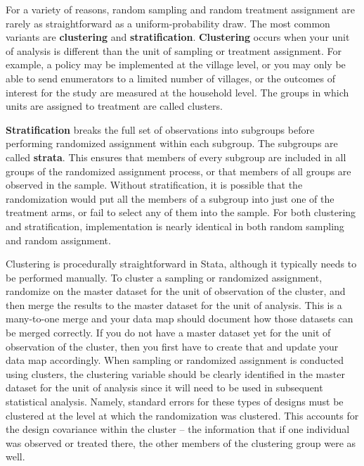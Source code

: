 For a variety of reasons, random sampling and random treatment assignment
are rarely as straightforward as a uniform-probability draw.
The most common variants are \textbf{clustering} and \textbf{stratification}.\cite{athey2017econometrics}
\textbf{Clustering} occurs when your unit of analysis is different
than the unit of sampling or treatment assignment.
For example, a policy may be implemented at the village level,
or you may only be able to send enumerators to a limited number of villages,
or the outcomes of interest for the study are measured at the household level.
The groups in which units are assigned to treatment are called clusters.
  
\textbf{Stratification} breaks the full set of observations into subgroups
before performing randomized assignment within each subgroup.
The subgroups are called \textbf{strata}.
This ensures that members of every subgroup
are included in all groups of the randomized assignment process,
or that members of all groups are observed in the sample.
Without stratification, it is possible that the randomization
would put all the members of a subgroup into just one of the treatment arms,
or fail to select any of them into the sample.
For both clustering and stratification,
implementation is nearly identical in both random sampling and random assignment.

Clustering is procedurally straightforward in Stata,
although it typically needs to be performed manually.
To cluster a sampling or randomized assignment,
randomize on the master dataset for the unit of observation of the cluster,
and then merge the results to the master dataset for the unit of analysis.
This is a many-to-one merge and your data map should document
how those datasets can be merged correctly.
If you do not have a master dataset yet for the unit of observation of the cluster,
then you first have to create that and update your data map accordingly.
When sampling or randomized assignment is conducted using clusters,
the clustering variable should be clearly identified in the master dataset
for the unit of analysis
since it will need to be used in subsequent statistical analysis.
Namely, standard errors for these types of designs must be clustered
at the level at which the randomization was clustered.
This accounts for the design covariance within the cluster --
the information that if one individual was observed or treated there,
the other members of the clustering group were as well.

